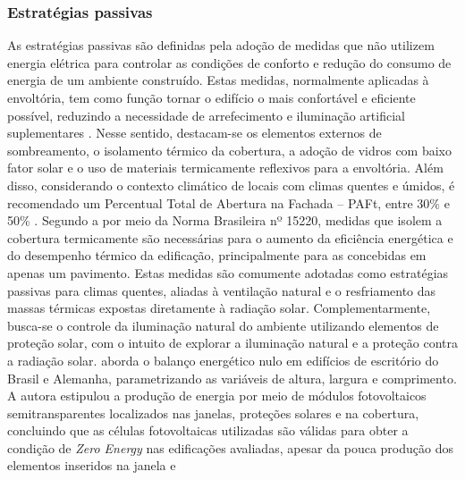 \subsubsection{Estratégias passivas}
As estratégias passivas são definidas pela adoção de medidas que não utilizem energia 
elétrica para controlar as condições de conforto e redução do consumo de energia de um 
ambiente construído. Estas medidas, normalmente aplicadas à envoltória, tem como função 
tornar o edifício o mais confortável e eficiente possível, reduzindo a necessidade de 
arrefecimento e iluminação artificial suplementares \cite{AmericanSocietyofHeatingRefrigeratingandAir-ConditioningEngineers-ASHRAE2014,Athienitis2015,Hensen2012,U.S.DepartmentofEnergy-USDOE2011}.\vspace*{0.3cm} \newline
Nesse sentido, destacam-se os elementos externos de sombreamento, o isolamento térmico 
da cobertura, a adoção de vidros com baixo fator solar e o uso de materiais termicamente 
reflexivos para a envoltória. Além disso, considerando o contexto climático de locais 
com climas quentes e úmidos, é recomendado um Percentual Total de Abertura na Fachada – PAFt, 
entre 30\% e 50\% \cite{Didone2014a}.\vspace*{0.3cm} \newline
Segundo a \textcite{AssociacaoBrasileiradeNormasTecnicas-ABNT2003} por meio da Norma Brasileira nº 15220,
medidas que isolem a cobertura termicamente são necessárias para o aumento da eficiência 
energética e do desempenho térmico da edificação, principalmente para as concebidas 
em apenas um pavimento. Estas medidas são comumente adotadas como estratégias passivas 
para climas quentes, aliadas à ventilação natural e o resfriamento das massas térmicas 
expostas diretamente à radiação solar. Complementarmente, busca-se o controle da 
iluminação natural do ambiente utilizando elementos de proteção solar, com o intuito de 
explorar a iluminação natural e a proteção contra a radiação solar.\vspace*{0.3cm} \newline
\textcite{Didone2014} aborda o balanço energético nulo em edifícios de escritório do Brasil e 
Alemanha, parametrizando as variáveis de altura, largura e comprimento. A autora 
estipulou a produção de energia por meio de módulos fotovoltaicos semitransparentes 
localizados nas janelas, proteções solares e na cobertura, concluindo que as células 
fotovoltaicas utilizadas são válidas para obter a condição de \textit{Zero Energy} nas 
edificações avaliadas, apesar da pouca produção dos elementos inseridos na janela e 
